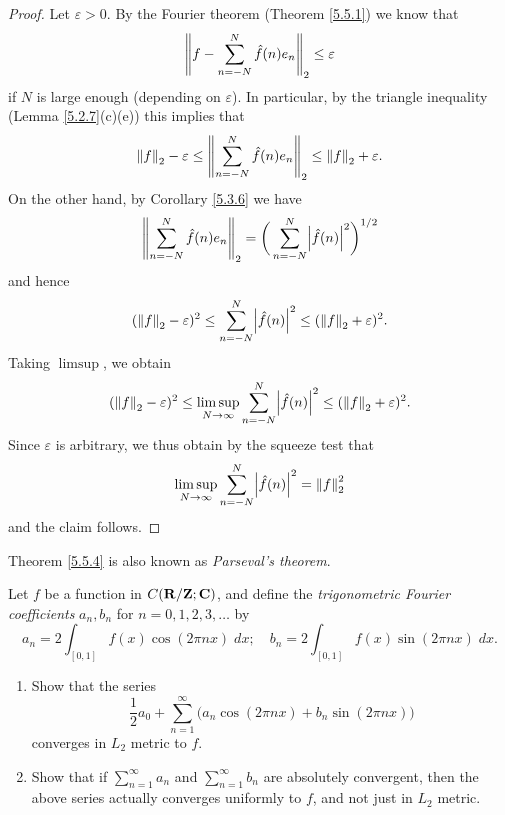 \begin{proof}
    Let \(\varepsilon > 0\).
    By the Fourier theorem (Theorem \ref{5.5.1}) we know that
    \[
        \norm*{f - \sum_{n = -N}^N \hat{f}(n) e_n}_2 \leq \varepsilon
    \]
    if \(N\) is large enough (depending on \(\varepsilon\)).
    In particular, by the triangle inequality (Lemma \ref{5.2.7}(c)(e)) this implies that
    \[
        \norm*{f}_2 - \varepsilon \leq \norm*{\sum_{n = -N}^N \hat{f}(n) e_n}_2 \leq \norm*{f}_2 + \varepsilon.
    \]
    On the other hand, by Corollary \ref{5.3.6} we have
    \[
        \norm*{\sum_{n = -N}^N \hat{f}(n) e_n}_2 = \bigg(\sum_{n = -N}^N \abs{\hat{f}(n)}^2\bigg)^{1 / 2}
    \]
    and hence
    \[
        (\norm*{f}_2 - \varepsilon)^2 \leq \sum_{n = -N}^N \abs{\hat{f}(n)}^2 \leq (\norm*{f}_2 + \varepsilon)^2.
    \]
    Taking \(\limsup\), we obtain
    \[
        (\norm*{f}_2 - \varepsilon)^2 \leq \limsup_{N \to \infty} \sum_{n = -N}^N \abs{\hat{f}(n)}^2 \leq (\norm*{f}_2 + \varepsilon)^2.
    \]
    Since \(\varepsilon\) is arbitrary, we thus obtain by the squeeze test that
    \[
        \limsup_{N \to \infty} \sum_{n = -N}^N \abs{\hat{f}(n)}^2 = \norm*{f}_2^2
    \]
    and the claim follows.
\end{proof}

\begin{note}
    Theorem \ref{5.5.4} is also known as \emph{Parseval's theorem}.
\end{note}

\exercisesection

\begin{exercise}\label{ex 5.5.1}
    Let \(f\) be a function in \(C(\R / \Z ; \C)\), and define the \emph{trigonometric Fourier coefficients} \(a_n, b_n\) for \(n = 0, 1, 2, 3, \dots\) by
    \[
        a_n = 2 \int_{[0, 1]} f(x) \cos(2 \pi n x) \; dx; \quad b_n = 2 \int_{[0, 1]} f(x) \sin(2 \pi n x) \; dx.
    \]
    \begin{enumerate}
        \item Show that the series
              \[
                  \frac{1}{2} a_0 + \sum_{n = 1}^\infty \big(a_n \cos(2 \pi n x) + b_n \sin(2 \pi n x)\big)
              \]
              converges in \(L_2\) metric to \(f\).
        \item Show that if \(\sum_{n = 1}^\infty a_n\) and \(\sum_{n = 1}^\infty b_n\) are absolutely convergent, then the above series actually converges uniformly to \(f\), and not just in \(L_2\) metric.
    \end{enumerate}
\end{exercise}

